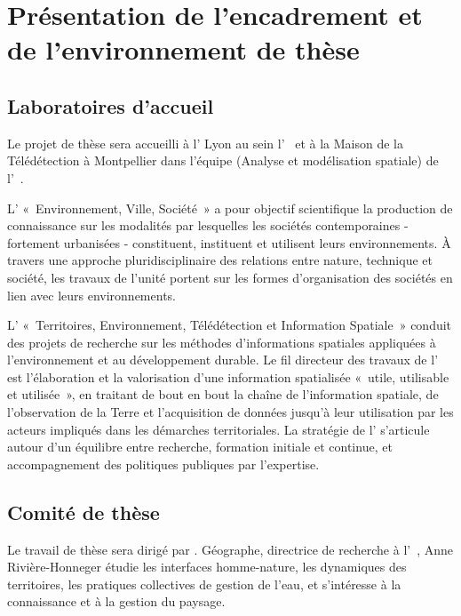 \section[environnement]
{Présentation de l'encadrement et de l'environnement de thèse}

\subsection{Laboratoires d'accueil}

Le projet de thèse sera accueilli à l'{\ENS} Lyon au sein l'{\UMR\ \EVS} et à la Maison de la Télédétection
à Montpellier dans l'équipe {\AMoS} (Analyse et modélisation spatiale) de l'{\UMR\ \TETIS}.

L'{\UMR} « Environnement, Ville, Société » a pour objectif scientifique la production de connaissance sur les modalités
par lesquelles les sociétés contemporaines - fortement urbanisées - constituent, instituent et utilisent leurs environnements.
À travers une approche pluridisciplinaire des relations entre nature, technique et société, les travaux de l'unité
portent sur les formes d'organisation des sociétés en lien avec leurs environnements.

L'{\UMR} « Territoires, Environnement, Télédétection et Information Spatiale » conduit des projets de recherche
sur les méthodes d'informations spatiales appliquées à l'environnement et au développement durable.
Le fil directeur des travaux de l'{\UMR} est l'élaboration et la valorisation d'une information spatialisée « utile, utilisable et utilisée »,
en traitant de bout en bout la chaîne de l'information spatiale, de l'observation de la Terre et
l'acquisition de données jusqu'à leur utilisation par les acteurs impliqués dans les démarches territoriales.
La stratégie de l'{\UMR} s'articule autour d'un équilibre entre recherche, formation initiale et continue,
et accompagnement des politiques publiques par l'expertise.


\subsection{Comité de thèse}

Le travail de thèse sera dirigé par . Géographe, directrice de recherche {\CNRS} à l'{\UMR\ \EVS},
Anne Rivière-Honneger étudie les interfaces homme-nature, les dynamiques des territoires,
les pratiques collectives de gestion de l'eau, et s'intéresse à la connaissance et à la gestion du paysage.

